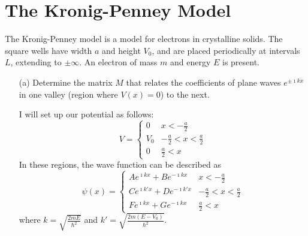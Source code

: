 \documentclass[a4paper,twoside]{article}
\begin{document}
\section{The Kronig-Penney Model}
The Kronig-Penney model is a model for electrons in crystalline solids. The square wells have width $ a $ and height $ V_0 $, and are placed periodically at intervals $ L $, extending to $ \pm \infty $. An electron of mass $ m $  and energy $ E $ is present.
\begin{itemize}
    \item[(a)] Determine the matrix $ M $ that relates the coefficients of plane waves $ e^{\pm \imath kx} $ in one valley (region where $ V(x) = 0 $) to the next.
        \begin{problem}
            I will set up our potential as follows:
            \begin{equation}
                V =
                \begin{cases}
                    0 & x < - \frac{a}{2} \\
                    V_0 & - \frac{a}{2} < x < \frac{a}{2} \\
                    0 & \frac{a}{2} < x
                \end{cases}
            \end{equation}
            In these regions, the wave function can be described as
            \begin{equation}
                \psi(x) =
                \begin{cases}
                    A e^{\imath k x} + B e^{- \imath k x} & x < - \frac{a}{2} \\
                    C e^{\imath k' x} + D e^{- \imath k' x} & - \frac{a}{2} < x < \frac{a}{2} \\
                    F e^{\imath k x} + G e^{- \imath k x} & \frac{a}{2} < x
                \end{cases}
            \end{equation}
            where $ k = \sqrt{\frac{2mE}{\hbar^2}} $ and $ k' = \sqrt{\frac{2m(E-V_0)}{\hbar^2}} $.


\end{problem}
\end{itemize}
\end{document}
